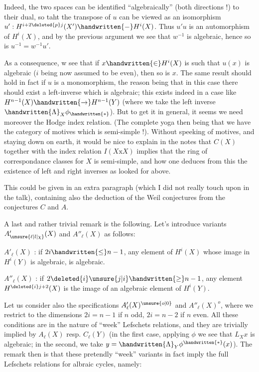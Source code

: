 Indeed, the two spaces can be identified ``algebraically'' (both directions !) to their dual, so taht the transpose of $u$ can be viewed as an
isomorphism $u':H^{i+2\deleted{p}j}(X')\handwritten{-}H^{i}(X)$. Thus $u'u$ is an  automorphism  of
$H^{i}(X)$, and by the previous argument we see that $w^{-1}$ is algebraic, hence
so is $u^{-1}=w^{-1}u'$.

As a consequence, w see that if $x\handwritten{\in}H^{i}(X)$ is such that $u(x)$ is
algebraic ($i$ being now assumed to be even), then so is $x$. The same result
should hold in fact if $u$ is a monomorphism, the reason being that in this
case there should exist a left-inverse which is algebraic; this exists indeed in a case like $H^{n-1}(X)\handwritten{\to}H^{n-1}(Y)$ (where we take the left inverse
$\handwritten{\Lambda}_{X}\phi_{\handwritten{*}}$). But to get it in general, it seems we need moreover the
Hodge index relation. (The complete yoga then being that we have the
category of motives which is semi-simple !). Without speeking of motives,
and staying down on earth, it would be nice to explain in the notes that
$C(X)$ together with the index relation $I(X\mathbin{\mathrm{x}}X)$ implies that the ring of
correspondance classes for $X$ is semi-simple, and how one deduces from this
the existence of left and right inverses as looked for above.

This could be given in an extra paragraph (which I did not really touch
upon in the talk), containing also the deduction of the Weil conjectures
from the conjectures $C$ and $A$.

A last and rather trivial remark is the following. Let's introduce
 variants $A'_{\unsure{\ell|l|\chi}}(X)$ and $A''_{\ell}(X)$ as follows:

$A'_{\ell}(X)$ : if $2i\handwritten{\leq} n-1$, any element  of $H^{i}(X)$ whose image in $H^{i}(Y)$ is alge\handwritten{\unsure{(|\,}}braic, is algebraic.

$A''_{\ell}(X)$ : if $2\deleted{i}\unsure{j|i}\handwritten{\geq} n-1$, any  element 
$H^{\deleted{i}j+2}(X)$ is  the image of an algebraic element of $H^{i}(Y)$.

Let us consider also the specifications $A'_{\ell}(X)^{\unsure{o|0}}$ and $A''_{\ell}(X)^{o}$, where we
restrict to the  dimensions $2i=n-1$ if $n$ odd, $2i=n-2$ if $n$
even. All these conditions are in the nature of ``week'' Lefschets relations,
and they are trivially implied by $A_{\ell}(X)$ resp. $C_{\ell}(Y)$ (in the first
case, applying $\phi$ we see that $L_{X}x$ is algebraic; in the second, we take
$y=\handwritten{\Lambda}_{Y}\phi^{\handwritten{*}}(x)$). The remark then is that these pretendly ``week'' variants
in fact imply the full Lefschets relations for albraic cycles, namely:

